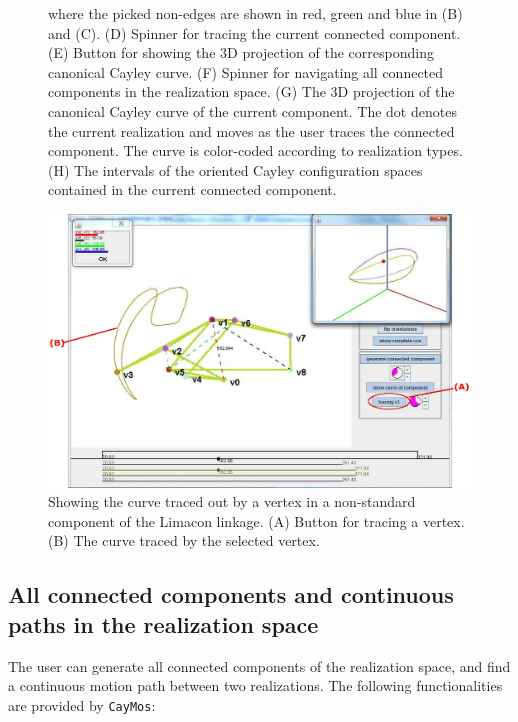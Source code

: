\documentclass[10pt]{article}
\begin{document}
\begin{figure}[hbtp]
{where the picked non-edges are shown in red, green and blue in (B) and (C). 
(D) Spinner for tracing the current connected component. 
(E) Button for showing the 3D projection of the corresponding canonical Cayley curve. 
(F) Spinner for navigating all connected components in the realization space. 
(G) The 3D projection of the canonical Cayley curve of the current component. 
The dot denotes the current realization and moves as the user traces the connected component. 
The curve is color-coded according to realization types. 
(H) The intervals of the oriented Cayley configuration spaces contained in the current connected component. }
\label{fig:components}
\end{figure}

\begin{figure}[hbtp]
\begin{center}
\includegraphics[width=.65\linewidth]{img/tracing}
\end{center}
\caption{
Showing the curve traced out by a vertex in a non-standard component of the Limacon linkage.   
(A) Button for tracing a vertex. 
(B) The curve traced by the selected vertex.}
\label{fig:tracing}
\end{figure}



\subsection{All connected components and continuous paths in the realization space}\label{subsec:path}

The user can generate all connected components of the realization space, and find a continuous motion path between two realizations. 
The following functionalities are provided by \texttt{CayMos}: 
\end{document}
